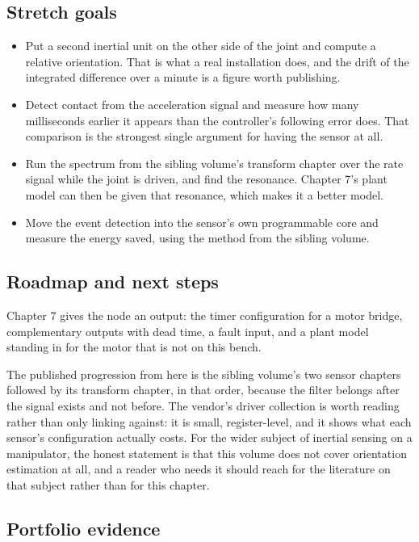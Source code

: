 \subsection*{Stretch goals}

\begin{itemize}
\item Put a second inertial unit on the other side of the joint and compute a
relative orientation. That is what a real installation does, and the drift of
the integrated difference over a minute is a figure worth publishing.
\item Detect contact from the acceleration signal and measure how many
milliseconds earlier it appears than the controller's following error does. That
comparison is the strongest single argument for having the sensor at all.
\item Run the spectrum from the sibling volume's transform chapter over the rate
signal while the joint is driven, and find the resonance. Chapter 7's plant
model can then be given that resonance, which makes it a better model.
\item Move the event detection into the sensor's own programmable core and
measure the energy saved, using the method from the sibling volume.
\end{itemize}

\subsection*{Roadmap and next steps}

Chapter 7 gives the node an output: the timer configuration for a motor bridge,
complementary outputs with dead time, a fault input, and a plant model standing
in for the motor that is not on this bench.

The published progression from here is the sibling volume's two sensor chapters
followed by its transform chapter, in that order, because the filter belongs
after the signal exists and not before. The vendor's driver collection is worth
reading rather than only linking against: it is small, register-level, and it
shows what each sensor's configuration actually costs. For the wider subject of
inertial sensing on a manipulator, the honest statement is that this volume does
not cover orientation estimation at all, and a reader who needs it should reach
for the literature on that subject rather than for this chapter.

\subsection*{Portfolio evidence}

